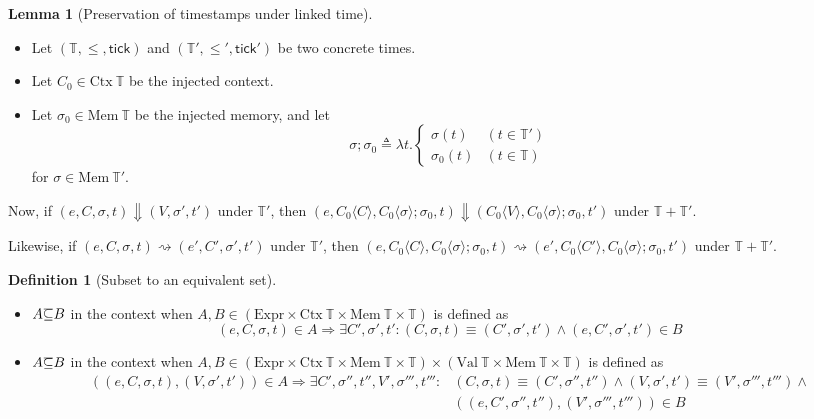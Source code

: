 \documentclass{article}
\theoremstyle{definition}
\newtheorem{definition}{Definition}[section]
\newtheorem{lem}{Lemma}[section]
\def\ovbarw{1.2mu}
\def\ovbarh{0.8}
\newcommand*{\ovbar}[1]{\mkern \ovbarw\overline{\mkern-\ovbarw{\smash{#1}\scalebox{1}[\ovbarh]{\vphantom{i}}}\mkern-\ovbarw}\mkern \ovbarw}
\newcommand*{\Expr}{\text{Expr}}
\newcommand*{\Time}{\mathbb{T}}
\newcommand*{\Ctx}[1]{\text{Ctx}\:{#1}}
\newcommand*{\Value}[1]{\text{Val}\:{#1}}
\newcommand*{\Mem}[1]{\text{Mem}\:{#1}}
\newcommand*{\tick}{\mathsf{tick}}
\newcommand*{\inject}[2]{{#1}\langle{#2}\rangle}
\begin{document}
\begin{lem}[Preservation of timestamps under linked time]
  $\:$

  \begin{itemize}
    \item Let $(\Time,\le,\tick)$ and $(\Time',\le',\tick')$ be two concrete times.
    \item Let $C_{0}\in\Ctx{\Time}$ be the injected context.
    \item Let $\sigma_{0}\in\Mem{\Time}$ be the injected memory, and let
          \[
            \sigma;\sigma_{0}\triangleq\lambda t.
            \begin{cases}
              \sigma(t)     & (t\in\Time') \\
              \sigma_{0}(t) & (t\in\Time)
            \end{cases}
          \]
          for $\sigma\in\Mem{\Time'}$.
  \end{itemize}

  Now, if $(e,C,\sigma,t)\Downarrow(V,\sigma',t')$ under $\Time'$, then
  $(e,\inject{C_0}{C},\inject{C_0}{\sigma};\sigma_{0},t)\Downarrow(\inject{C_0}{V},\inject{C_0}{\sigma};\sigma_0,t')$ under $\Time+\Time'$.

  Likewise, if $(e,C,\sigma,t)\rightsquigarrow(e',C',\sigma',t')$ under $\Time'$, then
  $(e,\inject{C_0}{C},\inject{C_0}{\sigma};\sigma_{0},t)\rightsquigarrow(e',\inject{C_0}{C'},\inject{C_0}{\sigma};\sigma_0,t')$ under $\Time+\Time'$.
\end{lem}

\begin{definition}[Subset to an equivalent set]
  $\:$

  \begin{itemize}
    \item $A\ovbar{\subseteq}B$ in the context when $A,B\in(\Expr\times\Ctx{\Time}\times\Mem{\Time}\times\Time)$ is defined as
          \[
            (e,C,\sigma,t)\in A\Rightarrow \exists C',\sigma',t' : (C,\sigma,t)\equiv(C',\sigma',t')\wedge(e,C',\sigma',t')\in B
          \]
    \item $A\ovbar{\subseteq}B$ in the context when $A,B\in(\Expr\times\Ctx{\Time}\times\Mem{\Time}\times\Time)\times(\Value{\Time}\times\Mem{\Time}\times\Time)$ is defined as
          \begin{align*}
            ((e,C,\sigma,t),(V,\sigma',t'))\in A\Rightarrow \exists C',\sigma'',t'',V',\sigma''',t''' : & (C,\sigma,t)\equiv(C',\sigma'',t'')\wedge(V,\sigma',t')\equiv(V',\sigma''',t''')\wedge \\
                                                                                                        & ((e,C',\sigma'',t''),(V',\sigma''',t'''))\in B
          \end{align*}
  \end{itemize}
\end{definition}
\end{document}
